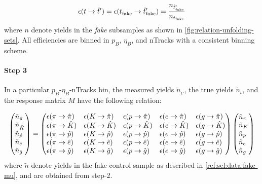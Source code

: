 \begin{equation}
    \misEff[t]{\hat{t}'} =
        \misEff[t^{\phantom{}}_\text{fake}]{\hat{t}'_\text{fake}} =
        \frac{n_{\hat{t}'_\text{fake}}}{n_{t_\text{fake}}}
\end{equation}
where $n$ denote yields in the \pidcalib \emph{fake} subsamples as shown
in \cref{fig:relation-unfolding-sets}.
All efficiencies are binned in $p_B$, $\eta_B$, and nTracks with a consistent
binning scheme.


\paragraph{Step 3}
In a particular $p_B$-$\eta_B$-nTracks bin,
the measured yields $\tilde{n}_{\hat{t}'}$,
the true yields $\tilde{n}_{t}$,
and the response matrix $M$ have the following relation:

\begin{equation}
    \begin{pmatrix*}[l]
        \tilde{n}_{\hat{\pi}} \\
        \tilde{n}_{\hat{K}}   \\
        \tilde{n}_{\hat{p}}   \\
        \tilde{n}_{\hat{e}}   \\
        \tilde{n}_{\hat{g}}   \\
    \end{pmatrix*}
    =
    \begin{pmatrix*}[l]
        \misEff[\pi]{\hat{\pi}} & \misEff[K]{\hat{\pi}} & \misEff[p]{\hat{\pi}} & \misEff[e]{\hat{\pi}} & \misEff[g]{\hat{\pi}} \\
        \misEff[\pi]{\hat{K}}   & \misEff[K]{\hat{K}}   & \misEff[p]{\hat{K}}   & \misEff[e]{\hat{K}}   & \misEff[g]{\hat{K}}   \\
        \misEff[\pi]{\hat{p}}   & \misEff[K]{\hat{p}}   & \misEff[p]{\hat{p}}   & \misEff[e]{\hat{p}}   & \misEff[g]{\hat{p}}   \\
        \misEff[\pi]{\hat{e}}   & \misEff[K]{\hat{e}}   & \misEff[p]{\hat{e}}   & \misEff[e]{\hat{e}}   & \misEff[g]{\hat{e}}   \\
        \misEff[\pi]{\hat{g}}   & \misEff[K]{\hat{g}}   & \misEff[p]{\hat{g}}   & \misEff[e]{\hat{g}}   & \misEff[g]{\hat{g}}   \\
    \end{pmatrix*}
    \begin{pmatrix*}[l]
        \tilde{n}_{{\pi}} \\
        \tilde{n}_{{K}}   \\
        \tilde{n}_{{p}}   \\
        \tilde{n}_{{e}}   \\
        \tilde{n}_{{g}}   \\
    \end{pmatrix*}
\end{equation}
where $\tilde{n}$ denote yields in the fake \muon control sample
as described in \cref{ref:sel:data:fake-mu},
and  are obtained from step-2.

